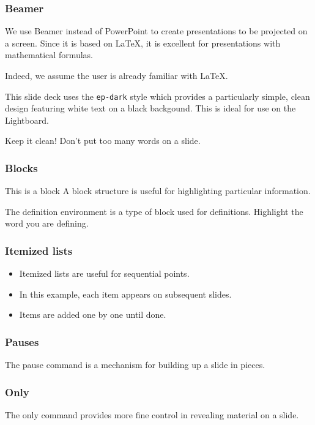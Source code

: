\documentclass[t,14pt,aspectratio=169]{beamer}
\begin{document}
\begin{frame}
  \frametitle{Beamer}
  \large

  We use \alert{Beamer} instead of PowerPoint to create presentations
  to be projected on a screen. Since it is based on \LaTeX, it is
  excellent for presentations with mathematical formulas.

  Indeed, we assume the user is already familiar with \LaTeX.
\end{frame}

\begin{frame}
  \large

  This slide deck uses the \texttt{ep-dark} style which provides a
  particularly simple, clean design featuring white text on a black
  backgound. This is ideal for use on the Lightboard.

  Keep it clean! Don't put too many words on a slide.
\end{frame}


\begin{frame}
  \frametitle{Blocks}
  \large
  \begin{block}{This is a block}
    A \alert{block} structure is useful for highlighting particular
    information.
  \end{block}

  \begin{definition}
    The \alert{definition} environment is a type of block used for
    definitions. Highlight the word you are defining.
  \end{definition}
\end{frame}

\begin{frame}
  \frametitle{Itemized lists}
  \large
  \begin{itemize}
  \item<+-> Itemized lists are useful for sequential points.
  \item<+-> In this example, each item appears on subsequent slides.
  \item<+-> Items are added one by one until done. 
  \end{itemize}
\end{frame}

\begin{frame}
  \frametitle{Pauses}
  \Large The \alert{pause} command 
  \pause 
  is a mechanism for building up a slide in pieces.
\end{frame}


\begin{frame}
  \frametitle{Only}
  \large  

  The \alert{only} command provides more fine control in revealing
  material on a slide.




\end{frame}
\end{document}
